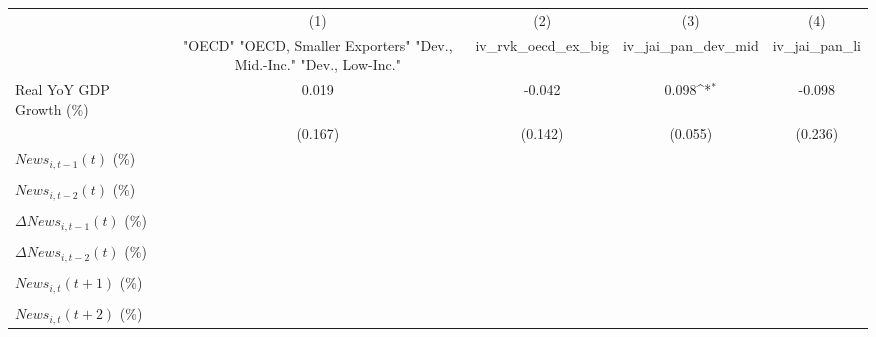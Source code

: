 {
\def\sym#1{\ifmmode^{#1}\else\(^{#1}\)\fi}
\begin{tabular}{l*{4}{c}}
\toprule
                    &\multicolumn{1}{c}{(1)}&\multicolumn{1}{c}{(2)}&\multicolumn{1}{c}{(3)}&\multicolumn{1}{c}{(4)}\\
                    &\multicolumn{1}{c}{ "OECD" "OECD, Smaller Exporters" "Dev., Mid.-Inc." "Dev., Low-Inc."}&\multicolumn{1}{c}{iv_rvk_oecd_ex_big}&\multicolumn{1}{c}{iv_jai_pan_dev_mid}&\multicolumn{1}{c}{iv_jai_pan_li}\\
\midrule
Real YoY GDP Growth (\%)&       0.019         &      -0.042         &       0.098\sym{*}  &      -0.098         \\
                    &     (0.167)         &     (0.142)         &     (0.055)         &     (0.236)         \\
\addlinespace
$ News_{i,t-1}(t)$ (\%)&                     &                     &                     &                     \\
                    &                     &                     &                     &                     \\
\addlinespace
$ News_{i,t-2}(t)$ (\%)&                     &                     &                     &                     \\
                    &                     &                     &                     &                     \\
\addlinespace
$ \Delta News_{i,t-1}(t)$ (\%)&                     &                     &                     &                     \\
                    &                     &                     &                     &                     \\
\addlinespace
$ \Delta News_{i,t-2}(t)$ (\%)&                     &                     &                     &                     \\
                    &                     &                     &                     &                     \\
\addlinespace
$ News_{i,t}(t+1)$ (\%)&                     &                     &                     &                     \\
                    &                     &                     &                     &                     \\
\addlinespace
$ News_{i,t}(t+2)$ (\%)&                     &                     &                     &                     \\

\end{tabular}}
